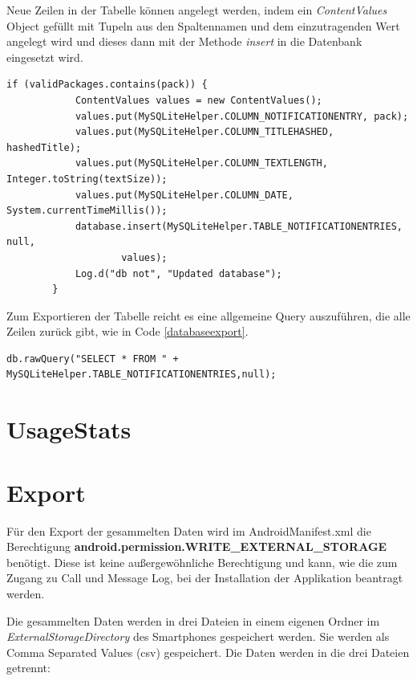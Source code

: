 Neue Zeilen in der Tabelle können angelegt werden, indem ein \emph{ContentValues} Object gefüllt 
mit Tupeln aus den Spaltennamen und dem einzutragenden Wert angelegt wird und dieses dann mit der Methode \emph{insert} in die Datenbank eingesetzt wird.

\begin{lstlisting}[frame=single, caption = Einfügen in die Datenbank, label=databaseinsert] 
if (validPackages.contains(pack)) {
            ContentValues values = new ContentValues();
            values.put(MySQLiteHelper.COLUMN_NOTIFICATIONENTRY, pack);
            values.put(MySQLiteHelper.COLUMN_TITLEHASHED, hashedTitle);
            values.put(MySQLiteHelper.COLUMN_TEXTLENGTH, Integer.toString(textSize));
            values.put(MySQLiteHelper.COLUMN_DATE, System.currentTimeMillis());
            database.insert(MySQLiteHelper.TABLE_NOTIFICATIONENTRIES, null,
                    values);
            Log.d("db not", "Updated database");
        }
\end{lstlisting}

Zum Exportieren der Tabelle reicht es eine allgemeine Query auszuführen, die alle Zeilen zurück gibt, wie in Code \ref{databaseexport}.

\begin{lstlisting}[frame=single, caption = Einfügen in die Datenbank, label=databaseexport] 
  db.rawQuery("SELECT * FROM " + MySQLiteHelper.TABLE_NOTIFICATIONENTRIES,null); 
\end{lstlisting}

\section{UsageStats}

\section{Export}

Für den Export der gesammelten Daten wird im AndroidManifest.xml die Berechtigung \textbf{android.permission.WRITE\_EXTERNAL\_STORAGE}
benötigt. 
Diese ist keine außergewöhnliche Berechtigung und kann, wie die zum Zugang zu Call und Message Log, bei der Installation der Applikation beantragt werden.
\par
Die gesammelten Daten werden in drei Dateien in einem eigenen Ordner im \emph{ExternalStorageDirectory} des Smartphones gespeichert werden.
Sie werden als Comma Separated Values (csv) gespeichert.
Die Daten werden in die drei Dateien getrennt:

